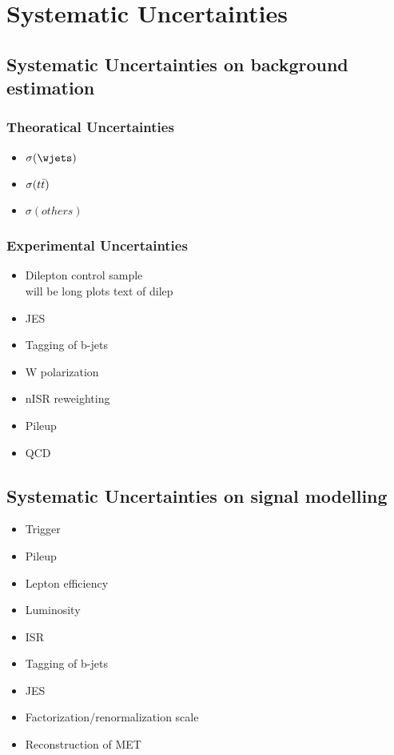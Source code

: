 \chapter{Systematic Uncertainties}
\section{Systematic Uncertainties on background estimation}
\subsection{Theoratical Uncertainties}
\begin{itemize}
\item $\sigma(\wjets)$ 
\item $\sigma(t\bar{t})$ 
\item $\sigma(others)$
\newpage
\end{itemize}
\subsection{Experimental Uncertainties}
\begin{itemize}
\item Dilepton control sample \\ 
will be long
plots
\newpage
text of dilep
\newpage
\item JES
\item Tagging of b-jets
\item W polarization  
\newpage
\item nISR reweighting
\item Pileup 
\item QCD
\end{itemize}
\newpage

\section{Systematic Uncertainties on signal modelling}
\begin{itemize}
\item Trigger
\item Pileup
\item Lepton efficiency 
\newpage
\item Luminosity
\item ISR
\item Tagging of b-jets
\newpage
\item JES
\item Factorization/renormalization scale
\item Reconstruction of MET 
\end{itemize}
\newpage
